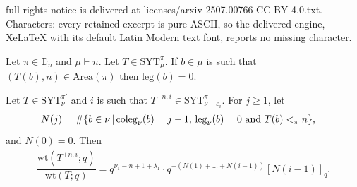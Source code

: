\documentclass[10pt,a4paper]{amsart}
\newcommand\leg{\mathrm{leg}}
\newcommand{\Area}{\mathrm{Area}}
\newcommand{\DD}{\mathbb{D}}
\newcommand{\SYT}{\mathrm{SYT}}
\newcommand{\coleg}{\mathrm{coleg}}
\newcommand{\wt}{\mathrm{wt}}
\begin{document}
full rights notice is delivered at licenses/arxiv-2507.00766-CC-BY-4.0.txt. Characters: every retained excerpt is pure ASCII, so the delivered engine, XeLaTeX with its default Latin Modern text font, reports no missing character.
\begin{lemma}\label{lem:leg0lem}
	Let $\pi \in \DD_n$ and $\mu \vdash n$. Let $T \in \SYT^\pi_\mu$. If $b \in \mu$ is such that $(T(b),n) \in \Area(\pi)$ then $\leg(b) = 0$.
\end{lemma}

\begin{lemma}
	Let $T \in \SYT^{\pi'}_\nu$ and $i$ is such that $T^{+n,i} \in \SYT^\pi_{\nu+\varepsilon_i}$. For $j \geq 1$, let \begin{align}\label{eq:Njdef}
		N(j) &= \# \{ b \in \nu\,|\, \coleg_\nu(b) = j-1 ,\, \leg_\nu(b) = 0 \hbox{ and } T(b) <_\pi n \}, 
	\end{align} and $N(0) = 0$.
	Then 
	\begin{align}\label{eq:wtcomparisongen}
		\dfrac{\wt(T^{+n,i};q)}{\wt(T;q)}=q^{\nu_1 - n + 1  + \lambda_1} \cdot q^{- (N(1)+\ldots + N(i-1))} [N(i-1)]_q.
	\end{align}
\end{lemma}
\end{document}
